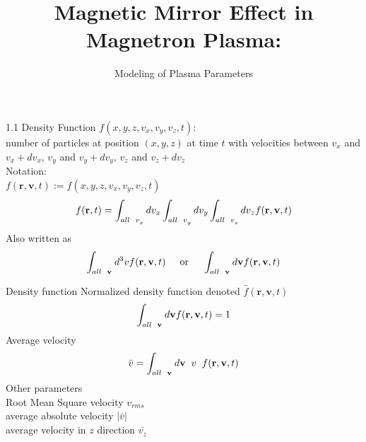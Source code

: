 \documentclass{beamer}
\title[Interacting Manifolds]{Magnetic Mirror Effect in Magnetron Plasma:}
\subtitle{Modeling of Plasma Parameters}
\begin{document}
	
	\begin{frame}
		\titlepage	
	\end{frame}	
	
	\begin{frame}[t]{1.1 Density Function }
			$ f(x, y, z, v_{x}, v_{y}, v_{z}, t) :$ \\ number of particles at position $ (x, y, z) $ at time $ t $ with velocities between $ v_{x} $ and $ v_{x} + dv_{x} $, $ v_{y} $ and $ v_{y} + dv_{y} $, $ v_{z} $ and $ v_{z} + dv_{z} $ \\
			Notation: \\
			$ f(\textbf{r}, \textbf{v}, t) := f(x, y, z, v_{x}, v_{y}, v_{z}, t)$
			$$\displaystyle f(\textbf{r},t) = \int_{all \hspace{0.2cm} v_{x}^{}} dv_{x} \int_{all \hspace{0.2cm} v_{y}^{}} dv_{y} \int_{all \hspace{0.2cm} v_{z}^{}} dv_{z} f(\textbf{r}, \textbf{v}, t) $$
			Also written as
			$$\displaystyle \int_{all \hspace{0.2cm} \textbf{v}^{}} d^{3}v f(\textbf{r}, \textbf{v}, t) \hspace{0.5cm}\textrm{or} \hspace{0.5cm}\int_{all \hspace{0.2cm} \textbf{v}^{}} d\textbf{v} f(\textbf{r}, \textbf{v}, t)$$
			\end{frame}
		
	\begin{frame}[t]{Density function}
		Normalized density function denoted $ \hat{f}(\textbf{r}, \textbf{v}, t) $
		$$\displaystyle \int_{all \hspace{0.2cm} \textbf{v}^{}} d\textbf{v} f(\textbf{r}, \textbf{v}, t) = 1$$
		Average velocity
		$$\displaystyle \bar{v} = \int_{all \hspace{0.2cm} \textbf{v}^{}} d\textbf{v} \hspace{0.2cm} v \hspace{0.2cm} f(\textbf{r}, \textbf{v}, t)$$
		Other parameters \\
		Root Mean Square velocity $v_{rms}$ \\
		average absolute velocity $|\bar{v}|$ \\
		average velocity in $z$ direction $\bar{v_{z}}$
	\end{frame}
	
\end{document}

